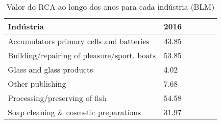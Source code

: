 \begin{table}
\centering
\caption{Valor do RCA ao longo dos anos para cada indústria (BLM)}
\begin{tabular}{p{6cm}p{1.5cm}p{1.5cm}p{1.5cm}p{1.5cm}p{1.5cm}}
\toprule
                                  Indústria &  2016 \\
\midrule
   Accumulators primary cells and batteries & 43.85 \\
Building/repairing of pleasure/sport. boats & 53.85 \\
                   Glass and glass products &  4.02 \\
                           Other publishing &  7.68 \\
              Processing/preserving of fish & 54.58 \\
      Soap cleaning \& cosmetic preparations & 31.97 \\
\bottomrule
\end{tabular}
\end{table}
